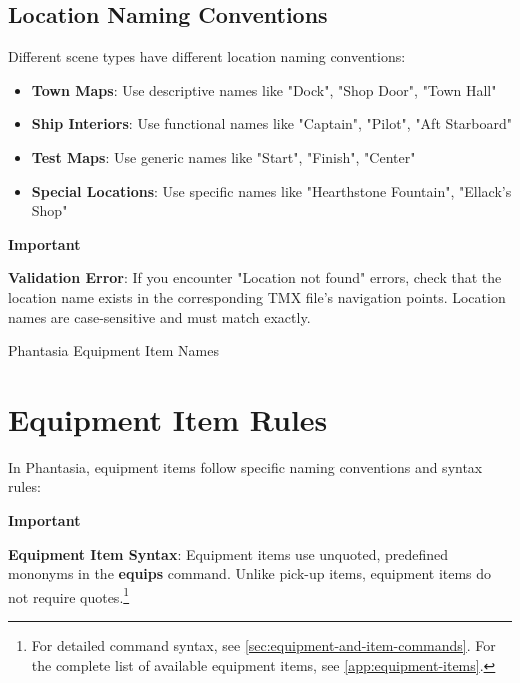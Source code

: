 \documentclass[11pt,letterpaper,oldstylefigures]{memoir}
\makeatletter
\newenvironment{Important}
{\begingroup
\small
\setlength{\parindent}{0pt}
\setlength{\parskip}{0.5em}
\allowdisplaybreaks
\setlength{\displaywidowpenalty}{0}
\setlength{\widowpenalty}{0}
\setlength{\clubpenalty}{0}
\setlength{\interlinepenalty}{0}
\begin{tcolorbox}[
    colback=yellow!5,
    colframe=yellow!75!black,
    boxrule=0.5pt,
    arc=2pt,
    left=0.5em,
    right=0.5em,
    top=0.25em,
    bottom=0.25em
]
\textbf{Important}
\end{tcolorbox}\par
}
{\endgroup}
\let\oldchapter\chapter
\def\chapter{%
  \@ifstar
    {\FountainScripting@starchapter}%
    {\@dblarg\FountainScripting@chapter}}
\def\FountainScripting@starchapter#1{\oldchapter*{#1}\chaptermark{#1}}
\def\FountainScripting@chapter[#1]#2{\oldchapter[#1]{#2}\chaptermark{#2}}
\newcommand{\fountain}[1]{\textbf{#1}}
\newcommand{\Phantasia}{{\irishfont Phantasia}}
\makeatother
\begin{document}
\subsection{Location Naming Conventions}

Different scene types have different location naming conventions:

\begin{itemize}
\item \textbf{Town Maps}: Use descriptive names like "Dock", "Shop Door", "Town Hall"
\item \textbf{Ship Interiors}: Use functional names like "Captain", "Pilot", "Aft Starboard"
\item \textbf{Test Maps}: Use generic names like "Start", "Finish", "Center"
\item \textbf{Special Locations}: Use specific names like "Hearthstone Fountain", "Ellack's Shop"
\end{itemize}

\begin{Important}
\textbf{Validation Error}: If you encounter "Location not found" errors, check that the location name exists in the corresponding TMX file's navigation points. Location names are case-sensitive and must match exactly.
\end{Important}

\chapter{\Phantasia{} Equipment Item Names}
\label{app:equipment-items}

\section{Equipment Item Rules}

In \Phantasia{}, equipment items follow specific naming conventions and syntax rules:

\begin{Important}
\textbf{Equipment Item Syntax}: Equipment items use unquoted, predefined mononyms in the \fountain{equips} command. Unlike pick-up items, equipment items do not require quotes.\footnote{For detailed command syntax, see \autoref{sec:equipment-and-item-commands}. For the complete list of available equipment items, see \autoref{app:equipment-items}.}
\end{Important}
\end{document}

